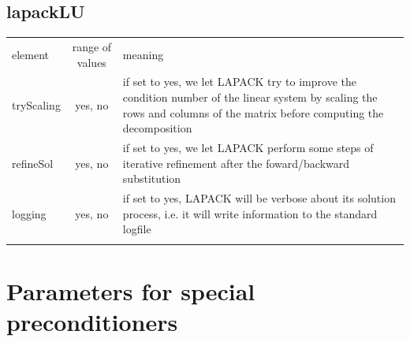 \subsection{lapackLU}
%
%
\begin{center}
\begin{tabular}{lcp{}}
\hline\noalign{\smallskip}
element & range of values & meaning \\
\noalign{\smallskip}\hline\noalign{\smallskip}
tryScaling & yes, no & if set to yes, we let LAPACK try to improve the
                       condition number of the linear system by scaling the
                       rows and columns of the matrix before computing the
                       decomposition\\
refineSol  & yes, no & if set to yes, we let LAPACK perform some steps of
                       iterative refinement after the foward/backward
                       substitution\\
logging    & yes, no & if set to yes, LAPACK will be verbose about its solution
	               process, i.e. it will write information to the standard
	               logfile\\
\noalign{\smallskip}\hline
\end{tabular}
\end{center}
%
%
\section{Parameters for special preconditioners}
%
%
